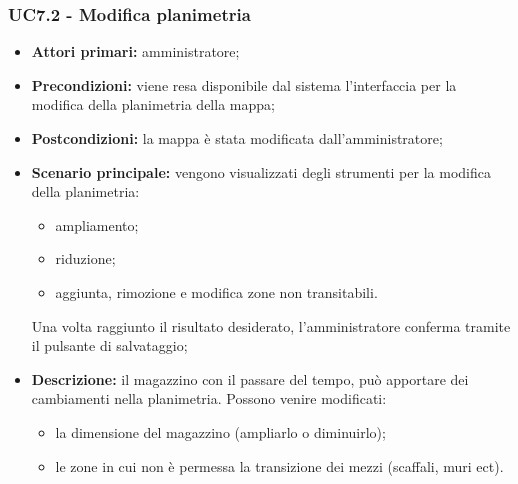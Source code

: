 \subsubsection{UC7.2 - Modifica planimetria}
\begin{itemize}
	\item 	\textbf{Attori primari:} amministratore;
	\item 	\textbf{Precondizioni:} viene resa disponibile dal sistema l’interfaccia per la modifica della planimetria della mappa;
	\item 	\textbf{Postcondizioni:} la mappa è stata modificata dall’amministratore;
	\item 	\textbf{Scenario principale:} vengono visualizzati degli strumenti per la modifica della planimetria:
	\begin{itemize}
		\item ampliamento;
		\item riduzione;
		\item aggiunta, rimozione e modifica zone non transitabili.
	\end{itemize}
	Una volta raggiunto il risultato desiderato, l’amministratore conferma tramite il pulsante di salvataggio;
	\item 	\textbf{Descrizione:} il magazzino con il passare del tempo, può apportare dei cambiamenti nella planimetria. Possono venire modificati:
	\begin{itemize}
		\item la dimensione del magazzino (ampliarlo o diminuirlo);
		\item le zone in cui non è permessa la transizione dei mezzi (scaffali, muri ect).
	\end{itemize}
\end{itemize}

